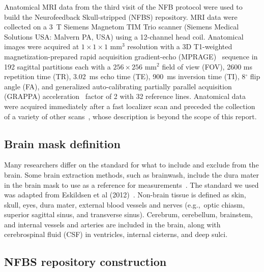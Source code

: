 Anatomical MRI data from the third visit of the NFB protocol were used to build the Neurofeedback Skull-stripped (NFBS) repository. MRI data were collected on a 3~T Siemens Magnetom TIM Trio scanner (Siemens Medical Solutions USA: Malvern PA, USA) using a 12-channel head coil. Anatomical images were acquired at $1\times1\times1$ mm$^3$ resolution with a 3D T1-weighted magnetization-prepared rapid acquisition gradient-echo (MPRAGE)~\cite{Mugler1990} sequence in 192 sagittal partitions each with a $256\times256$ mm$^2$ field of view (FOV), 2600 ms repetition time (TR), 3.02~ms echo time (TE), 900~ms inversion time (TI), 8$^{\circ}$ flip angle (FA), and generalized auto-calibrating partially parallel acquisition (GRAPPA) acceleration~\cite{Griswold2002} factor of 2 with 32 reference lines. Anatomical data were acquired immediately after a fast localizer scan and preceded the collection of a variety of other scans~\cite{nki_mrproto}, whose description is beyond the scope of this report.

\subsection*{Brain mask definition}

\par Many researchers differ on the standard for what to include and exclude from the brain. Some brain extraction methods, such as brainwash, include the dura mater in the brain mask to use as a reference for measurements~\cite{Brainwash}. The standard we used was adapted from Eskildsen et al (2012)~\cite{Eskildsen2012}. Non-brain tissue is defined as skin, skull, eyes, dura mater, external blood vessels and nerves (e.g.,~optic chiasm, superior sagittal sinus, and transverse sinus). Cerebrum, cerebellum, brainstem, and internal vessels and arteries are included in the brain, along with cerebrospinal fluid (CSF) in ventricles, internal cisterns, and deep sulci.

\subsection*{NFBS repository construction}

